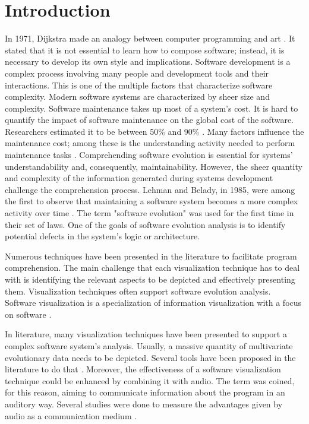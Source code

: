 \chapter{Introduction}

In 1971, Dijkstra made an analogy between computer programming and art \cite{Dijkstra1971a}.
It stated that it is not essential to learn how to compose software; instead, it is necessary to develop its own style and implications. 
Software development is a complex process involving many people and development tools and their interactions. This is one of the multiple factors that characterize software complexity. 
Modern software systems are characterized by sheer size and complexity. Software maintenance takes up most of a system's cost. It is hard to quantify the impact of software maintenance on the global cost of the software. 
Researchers estimated it to be between 50\% and 90\% \cite{Davis1995} \cite{Sommerville1995}\cite{Erlikh2000} \cite{seacord2003}. Many factors influence the maintenance cost; among these is the understanding activity needed to perform maintenance tasks \cite{Corbi1989}. Comprehending software evolution is essential for systems' understandability and, consequently, maintainability. However, the sheer quantity and complexity of the information generated during systems development challenge the comprehension process. Lehman and Belady, in 1985, were among the first to observe that maintaining a software system becomes a more complex activity over time \cite{Lehman1985}. The term "software evolution" was used for the first time in their set of laws.  One of the goals of software evolution analysis is to identify potential defects in the system's logic or architecture. 

Numerous techniques have been presented in the literature to facilitate program comprehension. The main challenge that each visualization technique has to deal with is identifying the relevant aspects to be depicted and effectively presenting them. Visualization techniques often support software evolution analysis. Software visualization is a specialization of information visualization with a focus on software \cite{Lanza2003}. 

In literature, many visualization techniques have been presented to support a complex software system's analysis. Usually, a massive quantity of multivariate evolutionary data needs to be depicted. Several tools have been proposed in the literature to do that \cite{Merino2018a}. Moreover, the effectiveness of a software visualization technique could be enhanced by combining it with audio. The term  was coined, for this reason, aiming to communicate information about the program in an auditory way.
Several studies were done to measure the advantages given by audio as a communication medium \cite{Alty1995}.

